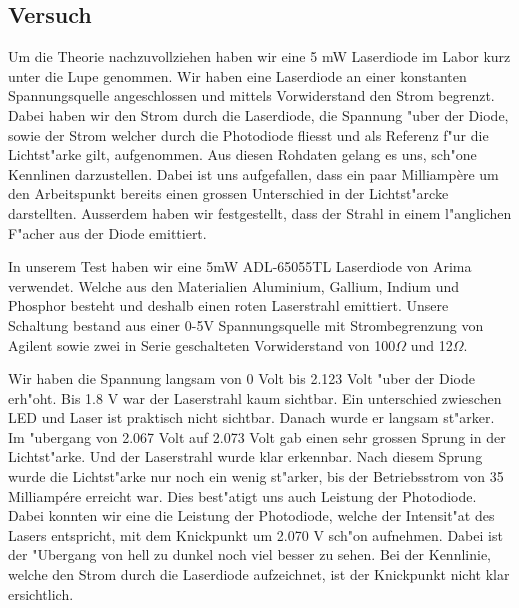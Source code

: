 \begin{refsection}
\subsection{Versuch}

Um die Theorie nachzuvollziehen haben wir eine 5 mW Laserdiode im Labor kurz 
unter die Lupe genommen. Wir haben eine Laserdiode an einer konstanten 
Spannungsquelle angeschlossen und mittels Vorwiderstand den Strom 
begrenzt. Dabei haben wir den Strom durch die Laserdiode, die Spannung "uber 
der Diode, sowie der Strom welcher durch die Photodiode fliesst und als 
Referenz f"ur die Lichtst"arke gilt, aufgenommen. Aus diesen Rohdaten gelang 
es uns, sch"one Kennlinen darzustellen. Dabei ist uns aufgefallen, dass ein 
paar Milliamp\`{e}re um den Arbeitspunkt bereits einen grossen Unterschied in
der Lichtst"arcke darstellten. Ausserdem haben wir festgestellt,
dass der Strahl in einem l"anglichen F"acher aus der Diode emittiert.

In unserem Test haben wir eine 5mW ADL-65055TL Laserdiode von Arima verwendet. 
Welche aus den Materialien Aluminium, Gallium, Indium und Phosphor besteht und 
deshalb einen roten Laserstrahl emittiert. Unsere Schaltung bestand aus einer 
0-5V Spannungsquelle mit Strombegrenzung von Agilent sowie zwei in Serie 
geschalteten Vorwiderstand von 100$\Omega$ und 12$\Omega$. 

Wir haben die Spannung langsam von 0 Volt bis 2.123 Volt "uber der Diode 
erh"oht. Bis 1.8 V war der Laserstrahl kaum sichtbar. Ein unterschied zwieschen 
LED und Laser ist praktisch nicht sichtbar. Danach wurde er langsam 
st"arker. Im "ubergang von 2.067 Volt auf 2.073 Volt gab einen sehr grossen 
Sprung in der Lichtst"arke. Und der Laserstrahl wurde klar erkennbar.
Nach diesem Sprung wurde die Lichtst"arke nur noch 
ein wenig st"arker, bis der Betriebsstrom von 35 Milliampére erreicht war. 
Dies best"atigt uns auch Leistung der Photodiode. Dabei konnten wir eine 
die Leistung der Photodiode, welche der Intensit"at des Lasers entspricht,
mit dem Knickpunkt um 2.070 V sch"on aufnehmen. 
Dabei ist 
der "Ubergang von hell zu dunkel noch viel besser zu sehen. Bei der Kennlinie, 
welche den Strom durch die Laserdiode aufzeichnet, ist der Knickpunkt nicht 
klar ersichtlich.


\end{refsection}
